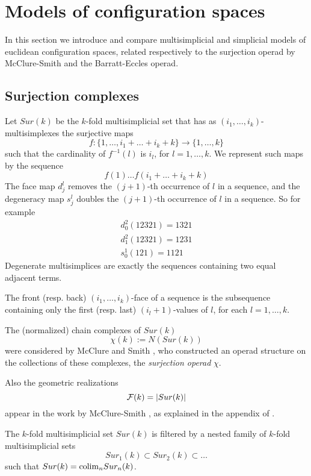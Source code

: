 
\section{Models of configuration spaces}

In this section we introduce and compare   multisimplicial and  simplicial  models of euclidean configuration spaces,
related respectively to the surjection operad by McClure-Smith and the Barratt-Eccles operad.

\subsection{Surjection complexes}

\begin{definition}
Let $Sur(k)$  be the $k$-fold multisimplicial set that has
as $(i_1,\dots,i_k)$-multisimplexes
the surjective maps $$f:\{1,\dots,i_1+\dots+i_k+k\} \to  \{1,\dots,k\}$$ such that
the cardinality of $f^{-1}(l)$ is $i_l$, for $l=1,\dots,k$. We represent such maps by the sequence
$$f(1) \dots f(i_1+\dots+i_k+k)$$
The face map
$d^l_j$ removes the $(j+1)$-th occurrence of $l$ in a sequence, and the degeneracy map
$s^l_j$ doubles the $(j+1)$-th occurrence of $l$ in a sequence.
So for example
\begin{align*}d^2_0(12321)=1321 \\ d^2_1(12321)=1231 \\ s^1_0(121)=1121
\end{align*}
Degenerate multisimplices are exactly the sequences containing two equal adjacent terms.

The front  (resp. back) $(i_1,\dots,i_k)$-face of a sequence is the subsequence containing only the first (resp. last)
$(i_l+1)$-values of $l$, for each
$l=1,\dots,k$.
\end{definition}


The (normalized) chain complexes
of $Sur(k)$  $$\chi(k):=N(Sur(k))$$
were considered by McClure and Smith
\cite{MS},
who constructed an operad structure
on the collections of these complexes, the {\it surjection operad} $\chi$.


Also the geometric realizations
$$\mathcal{F}(k)=\lvert Sur(k)\rvert$$ appear in the work by McClure-Smith \cite{MS}, as explained in the appendix of \cite{Deligne}.

The $k$-fold multisimplicial set $Sur(k)$ is filtered
by a nested family of $k$-fold multisimplicial sets
$$Sur_1(k) \subset Sur_2(k)  \subset \dots $$ such that $Sur(k) = {\rm colim}_n Sur_n(k)$.

